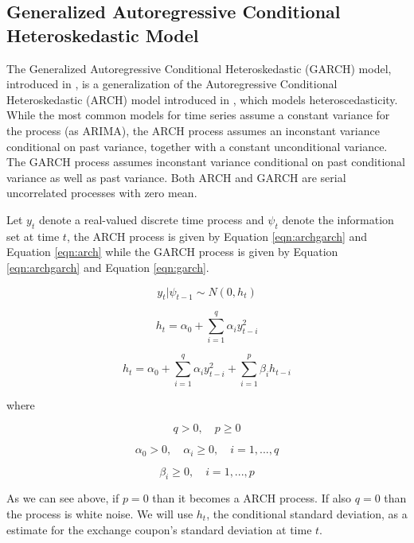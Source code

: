 \documentclass[cic,tc, english]{iiufrgs}
\begin{document}
\subsection{Generalized Autoregressive Conditional Heteroskedastic Model}

    The Generalized Autoregressive Conditional Heteroskedastic (GARCH) model, introduced in \citet{bollerslev1986}, is a generalization of the Autoregressive Conditional Heteroskedastic (ARCH) model introduced in \citet{engle1982}, which models heteroscedasticity. While the most common models for time series assume a constant variance for the process (as ARIMA), the ARCH process assumes an inconstant variance conditional on past variance, together with a constant unconditional variance. The GARCH process assumes inconstant variance conditional on past conditional variance as well as past variance. Both ARCH and GARCH are serial uncorrelated processes with zero mean.

    Let $y_t$ denote a real-valued discrete time process and $\psi_t$ denote the information set at time $t$, the ARCH process is given by Equation \ref{eqn:archgarch} and Equation \ref{eqn:arch} while the GARCH process is given by Equation \ref{eqn:archgarch} and Equation \ref{eqn:garch}.

    \begin{equation}
        \label{eqn:archgarch}
        y_t | \psi_{t-1} \sim N(0,h_t)
    \end{equation}

    \begin{equation}
        \label{eqn:arch}
        h_t = \alpha_0 + \displaystyle\sum_{i=1}^{q} \alpha_i y_{t-i}^2
    \end{equation}

    \begin{equation}
        \label{eqn:garch}
        h_t = \alpha_0 + \displaystyle\sum_{i=1}^{q} \alpha_i y_{t-i}^2 + \displaystyle\sum_{i=1}^{p} \beta_i h_{t-i}
    \end{equation}

    where

    $$q > 0, \quad   p \geq 0$$

    $$\alpha_0 > 0, \quad  \alpha_i \geq 0, \quad  i=1,...,q$$

    $$\beta_i \geq 0, \quad  i=1,...,p$$

    As we can see above, if $p = 0$ than it becomes a ARCH process. If also $q = 0$ than the process is white noise. We will use $h_t$, the conditional standard deviation, as a estimate for the exchange coupon's standard deviation at time $t$.
\end{document}
